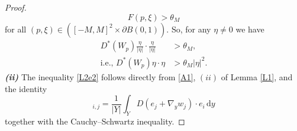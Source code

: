 \documentclass[11pt]{article}
\newcommand{\di}[1]{\,\mathrm{d}#1}
\begin{document}
\begin{proof}
\begin{equation*}
    F(p,\xi)>\theta_M
\end{equation*}
for all $(p,\xi)\in  ([-M,M]^2\times \partial B(0,1))$.
So, for any $\eta\neq 0$ we have 
\begin{align*}
    D^*(W_p)\frac{\eta}{|\eta|}\cdot \frac{\eta}{|\eta|}&>\theta_M,\\
     \text{i.e., } D^*(W_p)\eta\cdot \eta&>\theta_M|\eta|^2.
\end{align*}
\textbf{\textit{(ii)}} The inequality \eqref{L2e2} follows directly from \ref{A1}, $(ii)$ of Lemma \ref{L1}, and the identity 
\begin{equation*}
    [D^*(W_p)]_{i,j}=\frac{1}{|Y|}\int_Y D\left(e_j+\nabla_y w_j\right)\cdot e_i\di{y}
\end{equation*}together with the Cauchy--Schwartz inequality.
\end{proof}
\end{document}
